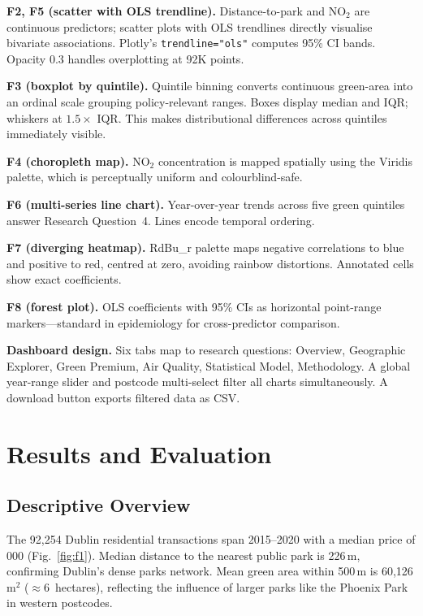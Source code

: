 \documentclass[conference]{IEEEtran}
\begin{document}
\textbf{F2, F5 (scatter with OLS trendline).} Distance-to-park and NO$_2$
are continuous predictors; scatter plots with OLS trendlines directly
visualise bivariate associations. Plotly's \texttt{trendline="ols"}
computes 95\% CI bands. Opacity 0.3 handles overplotting at 92K points.

\textbf{F3 (boxplot by quintile).} Quintile binning converts continuous
green-area into an ordinal scale grouping policy-relevant ranges. Boxes
display median and IQR; whiskers at $1.5 \times$ IQR. This makes
distributional differences across quintiles immediately visible.

\textbf{F4 (choropleth map).} NO$_2$ concentration is mapped spatially using
the Viridis palette, which is perceptually uniform and colourblind-safe.

\textbf{F6 (multi-series line chart).} Year-over-year trends across five
green quintiles answer Research Question~4. Lines encode temporal ordering.

\textbf{F7 (diverging heatmap).} RdBu\_r palette maps negative correlations
to blue and positive to red, centred at zero, avoiding rainbow distortions.
Annotated cells show exact coefficients.

\textbf{F8 (forest plot).} OLS coefficients with 95\% CIs as horizontal
point-range markers---standard in epidemiology for cross-predictor comparison.

\textbf{Dashboard design.} Six tabs map to research questions: Overview,
Geographic Explorer, Green Premium, Air Quality, Statistical Model,
Methodology. A global year-range slider and postcode multi-select filter all
charts simultaneously. A download button exports filtered data as CSV.

\section{Results and Evaluation}
\label{sec:results}

\subsection{Descriptive Overview}

The 92{,}254 Dublin residential transactions span 2015--2020 with a median
price of 000 (Fig.~\ref{fig:f1}). Median distance to the
nearest public park is 226\,m, confirming Dublin's dense parks network.
Mean green area within 500\,m is 60{,}126\,m$^2$ ($\approx$6~hectares),
reflecting the influence of larger parks like the Phoenix Park in western
postcodes.
\end{document}

